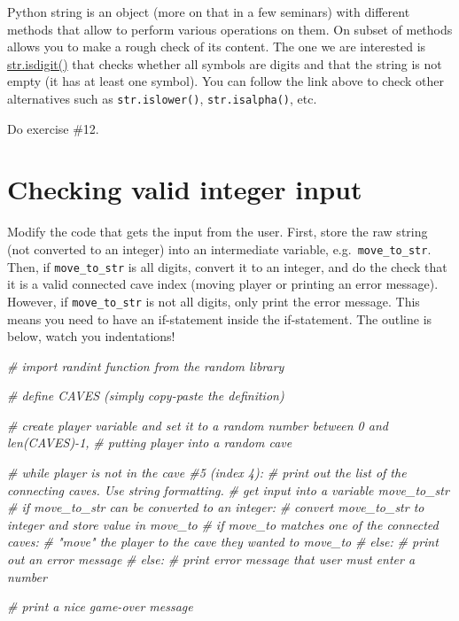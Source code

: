 \documentclass[
]{book}
\newenvironment{Shaded}{\begin{snugshade}}{\end{snugshade}}
\newcommand{\CommentTok}[1]{\textcolor[rgb]{0.56,0.35,0.01}{\textit{#1}}}
\begin{document}
Python string is an object (more on that in a few seminars) with different methods that allow to perform various operations on them. On subset of methods allows you to make a rough check of its content. The one we are interested is \href{https://docs.python.org/3/library/stdtypes.html\#str.isdigit}{str.isdigit()} that checks whether all symbols are digits and that the string is not empty (it has at least one symbol). You can follow the link above to check other alternatives such as \texttt{str.islower()}, \texttt{str.isalpha()}, etc.

Do exercise \#12.

\hypertarget{checking-valid-integer-input}{%
\section{Checking valid integer input}\label{checking-valid-integer-input}}

Modify the code that gets the input from the user. First, store the raw string (not converted to an integer) into an intermediate variable, e.g.~\texttt{move\_to\_str}. Then, if \texttt{move\_to\_str} is all digits, convert it to an integer, and do the check that it is a valid connected cave index (moving player or printing an error message). However, if \texttt{move\_to\_str} is not all digits, only print the error message. This means you need to have an if-statement inside the if-statement. The outline is below, watch you indentations!

\begin{Shaded}
\begin{Highlighting}[]
\CommentTok{\# import randint function from the random library}

\CommentTok{\# define CAVES (simply copy{-}paste the definition)}

\CommentTok{\# create \textasciigrave{}player\textasciigrave{} variable and set it to a random number between 0 and len(CAVES){-}1, }
\CommentTok{\# putting player into a random cave}

\CommentTok{\# while player is not in the cave \#5 (index 4):}
    \CommentTok{\# print out the list of the connecting caves. Use string formatting.}
    \CommentTok{\# get input into a variable \textasciigrave{}move\_to\_str\textasciigrave{}}
    \CommentTok{\# if move\_to\_str can be converted to an integer:}
        \CommentTok{\# convert move\_to\_str to integer and store value in move\_to}
        \CommentTok{\# if \textasciigrave{}move\_to\textasciigrave{} matches one of the connected caves:}
            \CommentTok{\# "move" the \textasciigrave{}player\textasciigrave{} to the cave they wanted to \textasciigrave{}move\_to\textasciigrave{}}
        \CommentTok{\# else:}
            \CommentTok{\# print out an error message}
    \CommentTok{\# else:}
        \CommentTok{\# print error message that user must enter a number}
    
\CommentTok{\# print a nice game{-}over message}
\end{Highlighting}
\end{Shaded}
\end{document}
